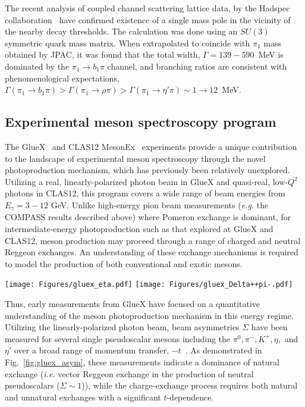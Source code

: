 The recent analysis of coupled channel scattering lattice data, by the Hadspec collaboration~\cite{Woss:2020ayi} have confirmed existence of a single mass pole in the vicinity of the nearby decay thresholds. The calculation was done using an $SU(3)$ symmetric quark mass matrix. When extrapolated to coincide with $\pi_1$ mass obtained by JPAC, it was found that the total width, $\Gamma = 139-590$~MeV is dominated by the $\pi_1 \to b_1\pi$  channel, and branching ratios are consistent with phenomenological expectations,  $\Gamma(\pi_1 \to b_1\pi) > \Gamma(\pi_1 \to \rho\pi) > \Gamma(\pi_1 \to \eta'\pi) \sim 1 \to 12$~MeV. 



\subsection{Experimental meson spectroscopy program} 
\label{sec:expmesons}

The GlueX~\cite{E12-06-102,GlueX:2014hxq,Adhikari:2020cvz} and CLAS12 MesonEx~\cite{E12-11-005} experiments provide a unique contribution to the landscape of experimental meson spectroscopy through the novel photoproduction mechanism, which has previously been relatively unexplored.  Utilizing a real, linearly-polarized photon beam in GlueX and quasi-real, low-$Q^2$ photons in CLAS12, this program covers a wide range of beam energies from $E_\gamma = 3-12$ GeV.  Unlike high-energy pion beam measurements (\textit{e.g.} the COMPASS results described above) where Pomeron exchange is dominant, for intermediate-energy photoproduction such as that explored at GlueX and CLAS12, meson production may proceed through a range of charged and neutral Reggeon exchanges.  An understanding of these exchange mechanisms is required to model the production of both conventional and exotic mesons.  

\begin{figure*}
\begin{center}
\texttt{[image: Figures/gluex\_eta.pdf]}
\texttt{[image: Figures/gluex\_Delta++pi-.pdf]}
\caption{Linearly-polarized $\Sigma$ beam asymmetries measured by GlueX for $\eta$~\cite{GlueX:2020fam} (left) and $\pi^-$~\cite{GlueX:2019adl} (right) meson production as a function of momentum transfer, $-t$.}
\label{fig:gluex_asym}
\end{center}
\end{figure*}

Thus, early measurements from GlueX have focused on a quantitative understanding of the meson photoproduction mechanism in this energy regime.  Utilizing the linearly-polarized photon beam, beam asymmetries $\Sigma$ have been measured for several single pseudoscalar mesons including the $\pi^0, \pi^-, K^+, \eta,$ and $\eta'$ over a broad range of momentum transfer, $-t$~\cite{GlueX:2017zoo,GlueX:2020fam,GlueX:2019adl,GlueX:2020qat}.  As demonstrated in Fig.~\ref{fig:gluex_asym}, these measurements indicate a dominance of natural exchange (\textit{i.e.} vector Reggeon exchange in the production of neutral pseudoscalars ($\Sigma\sim1$)), while the charge-exchange process requires both natural and unnatural exchanges with a significant $t$-dependence.  

